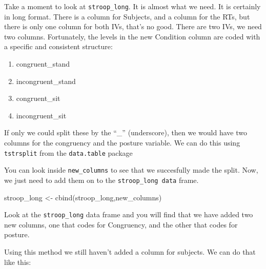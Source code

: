\documentclass[
]{book}
\newenvironment{Shaded}{\begin{snugshade}}{\end{snugshade}}
\newcommand{\AttributeTok}[1]{\textcolor[rgb]{0.77,0.63,0.00}{#1}}
\newcommand{\FunctionTok}[1]{\textcolor[rgb]{0.00,0.00,0.00}{#1}}
\newcommand{\NormalTok}[1]{#1}
\newcommand{\OtherTok}[1]{\textcolor[rgb]{0.56,0.35,0.01}{#1}}
\newcommand{\SpecialCharTok}[1]{\textcolor[rgb]{0.00,0.00,0.00}{#1}}
\newcommand{\StringTok}[1]{\textcolor[rgb]{0.31,0.60,0.02}{#1}}
\providecommand{\tightlist}{%
  \setlength{\itemsep}{0pt}\setlength{\parskip}{0pt}}
\begin{document}
Take a moment to look at \texttt{stroop\_long}. It is almost what we need. It is certainly in long format. There is a column for Subjects, and a column for the RTs, but there is only one column for both IVs, that's no good. There are two IVs, we need two columns. Fortunately, the levels in the new Condition column are coded with a specific and consistent structure:

\begin{enumerate}
\def\labelenumi{\arabic{enumi}.}
\tightlist
\item
  congruent\_stand
\item
  incongruent\_stand
\item
  congruent\_sit
\item
  incongruent\_sit
\end{enumerate}

If only we could split these by the ``\_'' (underscore), then we would have two columns for the congruency and the posture variable. We can do this using \texttt{tstrsplit} from the \texttt{data.table} package

\begin{Shaded}
\end{Shaded}

You can look inside \texttt{new\_columns} to see that we succesfully made the split. Now, we just need to add them on to the \texttt{stroop\_long\ data} frame.

\begin{Shaded}
\begin{Highlighting}[]
\NormalTok{stroop\_long }\OtherTok{\textless{}{-}} \FunctionTok{cbind}\NormalTok{(stroop\_long,new\_columns)}
\end{Highlighting}
\end{Shaded}

Look at the \texttt{stroop\_long} data frame and you will find that we have added two new columns, one that codes for Congruency, and the other that codes for posture.

Using this method we still haven't added a column for subjects. We can do that like this:
\end{document}
